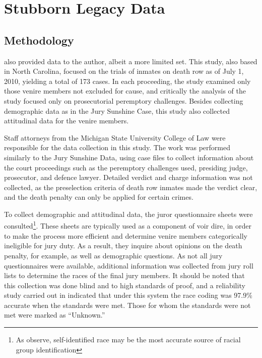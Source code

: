 \section{Stubborn Legacy Data} \label{sec:norcardata}

\subsection{Methodology}

\cite{StubbornLegacy} also provided data to the author, albeit a more limited set. This study, also based in North Carolina,
focused on the trials of inmates on death row as of July 1, 2010, yielding a total of 173 cases. In each proceeding, the study
examined only those venire members not excluded for cause, and critically the analysis of the study focused only on prosecutorial
peremptory challenges. Besides collecting demographic data as in the Jury Sunshine Case, this study also collected attitudinal
data for the venire members.

Staff attorneys from the Michigan State University College of Law were responsible for the data collection in this study. The work
was performed similarly to the Jury Sunshine Data, using case files to collect information about the court proceedings such as the
peremptory challenges used, presiding judge, prosecutor, and defence lawyer. Detailed verdict and charge information was not
collected, as the preselection criteria of death row inmates made the verdict clear, and the death penalty can only be applied for
certain crimes.

To collect demographic and attitudinal data, the juror questionnaire sheets were consulted\footnote{As \cite{StubbornLegacy}
  observe, self-identified race may be the most accurate source of racial group identification}. These sheets are typically used
as a component of voir dire, in order to make the process more efficient and determine venire members categorically ineligible for
jury duty. As a result, they inquire about opinions on the death penalty, for example, as well as demographic questions. As not
all jury questionnaires were available, additional information was collected from jury roll lists to determine the races of the
final jury members. It should be noted that this collection was done blind and to high standards of proof, and a reliability study
carried out in \cite{StubbornLegacy} indicated that under this system the race coding was 97.9\% accurate when the standards were
met. Those for whom the standards were not met were marked as ``Unknown.''

